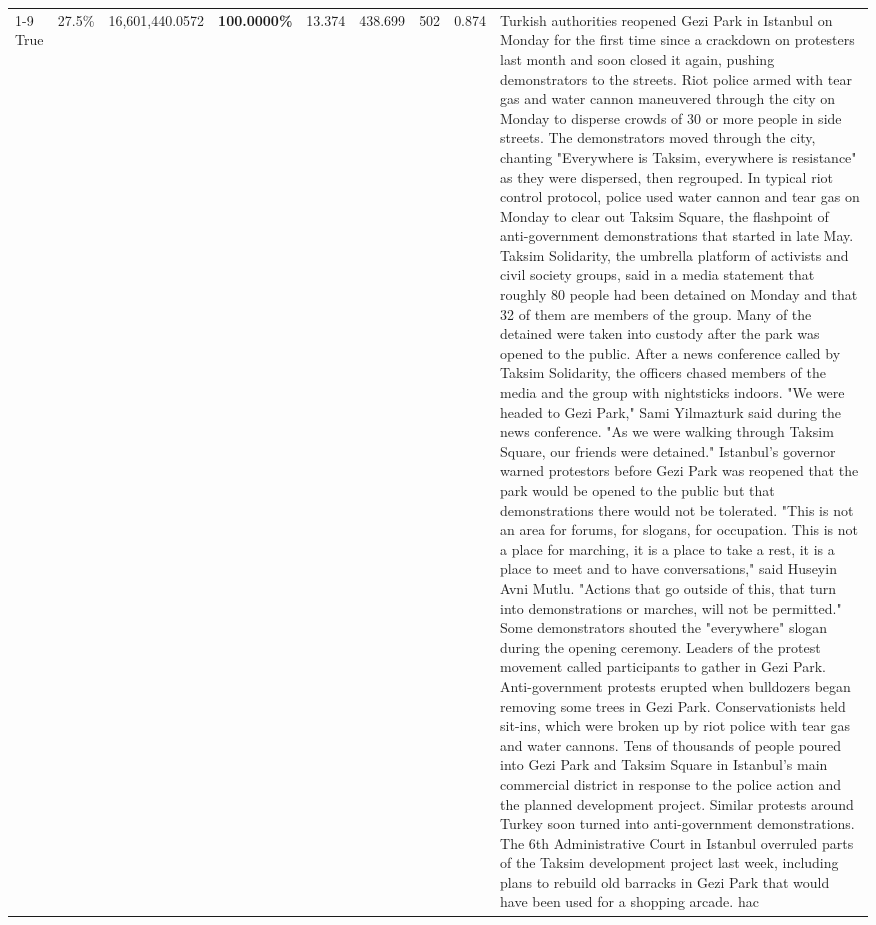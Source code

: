 \begin{table}[H]
\begin{tabular}{lllrlllll}
\cline{1-9}
True & 27.5\% & 16,601,440.0572 & \bfseries \color{red} 100.0000\% & 13.374 & 438.699 & 502 & 0.874 & Turkish authorities reopened Gezi Park in Istanbul on Monday for the first time since a crackdown on protesters last month and soon closed it again, pushing demonstrators to the streets. Riot police armed with tear gas and water cannon maneuvered through the city on Monday to disperse crowds of 30 or more people in side streets. The demonstrators moved through the city, chanting "Everywhere is Taksim, everywhere is resistance" as they were dispersed, then regrouped. In typical riot control protocol, police used water cannon and tear gas on Monday to clear out Taksim Square, the flashpoint of anti-government demonstrations that started in late May. Taksim Solidarity, the umbrella platform of activists and civil society groups, said in a media statement that roughly 80 people had been detained on Monday and that 32 of them are members of the group. Many of the detained were taken into custody after the park was opened to the public. After a news conference called by Taksim Solidarity, the officers chased members of the media and the group with nightsticks indoors. "We were headed to Gezi Park," Sami Yilmazturk said during the news conference. "As we were walking through Taksim Square, our friends were detained." Istanbul's governor warned protestors before Gezi Park was reopened that the park would be opened to the public but that demonstrations there would not be tolerated. "This is not an area for forums, for slogans, for occupation. This is not a place for marching, it is a place to take a rest, it is a place to meet and to have conversations," said Huseyin Avni Mutlu. "Actions that go outside of this, that turn into demonstrations or marches, will not be permitted." Some demonstrators shouted the "everywhere" slogan during the opening ceremony. Leaders of the protest movement called participants to gather in Gezi Park. Anti-government protests erupted when bulldozers began removing some trees in Gezi Park. Conservationists held sit-ins, which were broken up by riot police with tear gas and water cannons. Tens of thousands of people poured into Gezi Park and Taksim Square in Istanbul's main commercial district in response to the police action and the planned development project. Similar protests around Turkey soon turned into anti-government demonstrations. The 6th Administrative Court in Istanbul overruled parts of the Taksim development project last week, including plans to rebuild old barracks in Gezi Park that would have been used for a shopping arcade. hac \\

\end{tabular}
\end{table}
